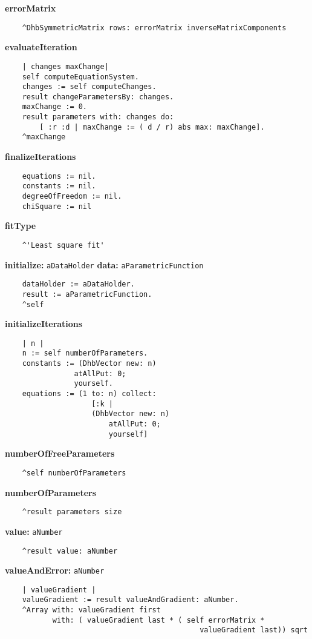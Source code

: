 {\bf errorMatrix}
\begin{verbatim}
    ^DhbSymmetricMatrix rows: errorMatrix inverseMatrixComponents

\end{verbatim}
{\bf evaluateIteration}
\begin{verbatim}
    | changes maxChange|
    self computeEquationSystem.
    changes := self computeChanges.
    result changeParametersBy: changes.
    maxChange := 0.
    result parameters with: changes do: 
        [ :r :d | maxChange := ( d / r) abs max: maxChange].
    ^maxChange

\end{verbatim}
{\bf finalizeIterations}
\begin{verbatim}
    equations := nil.
    constants := nil.
    degreeOfFreedom := nil.
    chiSquare := nil

\end{verbatim}
{\bf fitType}
\begin{verbatim}
    ^'Least square fit'

\end{verbatim}
{\bf initialize:} {\tt aDataHolder} {\bf data:} {\tt aParametricFunction}
\begin{verbatim}
    dataHolder := aDataHolder.
    result := aParametricFunction.
    ^self

\end{verbatim}
{\bf initializeIterations}
\begin{verbatim}
    | n |
    n := self numberOfParameters.
    constants := (DhbVector new: n)
                atAllPut: 0;
                yourself.
    equations := (1 to: n) collect: 
                    [:k | 
                    (DhbVector new: n)
                        atAllPut: 0;
                        yourself]

\end{verbatim}
{\bf numberOfFreeParameters}
\begin{verbatim}
    ^self numberOfParameters

\end{verbatim}
{\bf numberOfParameters}
\begin{verbatim}
    ^result parameters size

\end{verbatim}
{\bf value:} {\tt aNumber}
\begin{verbatim}
    ^result value: aNumber

\end{verbatim}
{\bf valueAndError:} {\tt aNumber}
\begin{verbatim}
    | valueGradient |
    valueGradient := result valueAndGradient: aNumber.
    ^Array with: valueGradient first
           with: ( valueGradient last * ( self errorMatrix * 
                                             valueGradient last)) sqrt

\end{verbatim}

